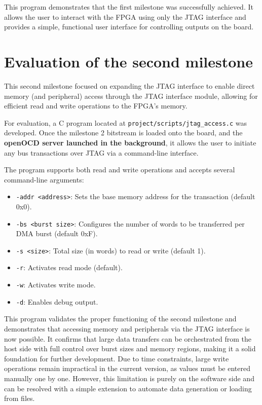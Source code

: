 \documentclass[a4paper,11pt,oneside]{report}
\begin{document}
This program demonstrates that the first milestone was successfully achieved.  
It allows the user to interact with the FPGA using only the JTAG interface and provides a simple, functional user interface for controlling outputs on the board.

\section{Evaluation of the second milestone}
\label{sec:evalution_program}

This second milestone focused on expanding the JTAG interface to enable direct memory (and peripheral) access through the JTAG interface module, allowing for efficient read and write operations to the FPGA’s memory.

For evaluation, a C program located at \texttt{project/scripts/jtag\_access.c} was developed.
Once the milestone 2 bitstream is loaded onto the board, and the \textbf{openOCD server launched in the background}, it allows the user to initiate any bus transactions over JTAG via a command-line interface.

The program supports both read and write operations and accepts several command-line arguments:
\begin{itemize}
    \item \texttt{-addr <address>}: Sets the base memory address for the transaction (default 0x0).
    \item \texttt{-bs <burst size>}: Configures the number of words to be transferred per DMA burst (default 0xF).
    \item \texttt{-s <size>}: Total size (in words) to read or write (default 1).
    \item \texttt{-r}: Activates read mode (default).
    \item \texttt{-w}: Activates write mode.
    \item \texttt{-d}: Enables debug output.
\end{itemize}

This program validates the proper functioning of the second milestone and demonstrates that accessing memory and peripherals via the JTAG interface is now possible.
It confirms that large data transfers can be orchestrated from the host side with full control over burst sizes and memory regions, making it a solid foundation for further development.
Due to time constraints, large write operations remain impractical in the current version, as values must be entered manually one by one. 
However, this limitation is purely on the software side and can be resolved with a simple extension to automate data generation or loading from files.
\end{document}

